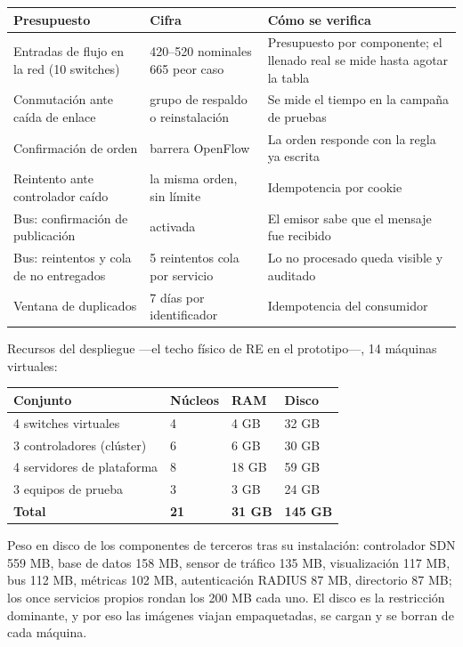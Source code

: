 \documentclass[11pt,a4paper]{article}
\begin{document}
\begin{longtable}{p{5.6cm}p{2.6cm}p{5.8cm}}
\toprule
\textbf{Presupuesto} & \textbf{Cifra} & \textbf{Cómo se verifica}\\
\midrule
Entradas de flujo en la red (10 switches) & 420--520 nominales \textperiodcentered{} 665 peor caso & Presupuesto por componente; el llenado real se mide hasta agotar la tabla\\
Conmutación ante caída de enlace & grupo de respaldo o reinstalación & Se mide el tiempo en la campaña de pruebas\\
Confirmación de orden & barrera OpenFlow & La orden responde con la regla ya escrita\\
Reintento ante controlador caído & la misma orden, sin límite & Idempotencia por cookie\\
Bus: confirmación de publicación & activada & El emisor sabe que el mensaje fue recibido\\
Bus: reintentos y cola de no entregados & 5 reintentos \textperiodcentered{} cola por servicio & Lo no procesado queda visible y auditado\\
Ventana de duplicados & 7 días por identificador & Idempotencia del consumidor\\
\bottomrule
\end{longtable}

Recursos del despliegue ---el techo físico de RE en el prototipo---, 14 máquinas virtuales:

\begin{longtable}{p{5.6cm}p{2.4cm}p{2.4cm}p{3.2cm}}
\toprule
\textbf{Conjunto} & \textbf{Núcleos} & \textbf{RAM} & \textbf{Disco}\\
\midrule
4 switches virtuales & 4 & 4 GB & 32 GB\\
3 controladores (clúster) & 6 & 6 GB & 30 GB\\
4 servidores de plataforma & 8 & 18 GB & 59 GB\\
3 equipos de prueba & 3 & 3 GB & 24 GB\\
\textbf{Total} & \textbf{21} & \textbf{31 GB} & \textbf{145 GB}\\
\bottomrule
\end{longtable}

Peso en disco de los componentes de terceros tras su instalación: controlador SDN 559 MB, base de datos 158 MB, sensor de tráfico 135 MB, visualización 117 MB, bus 112 MB, métricas 102 MB, autenticación RADIUS 87 MB, directorio 87 MB; los once servicios propios rondan los 200 MB cada uno. El disco es la restricción dominante, y por eso las imágenes viajan empaquetadas, se cargan y se borran de cada máquina.
\end{document}
